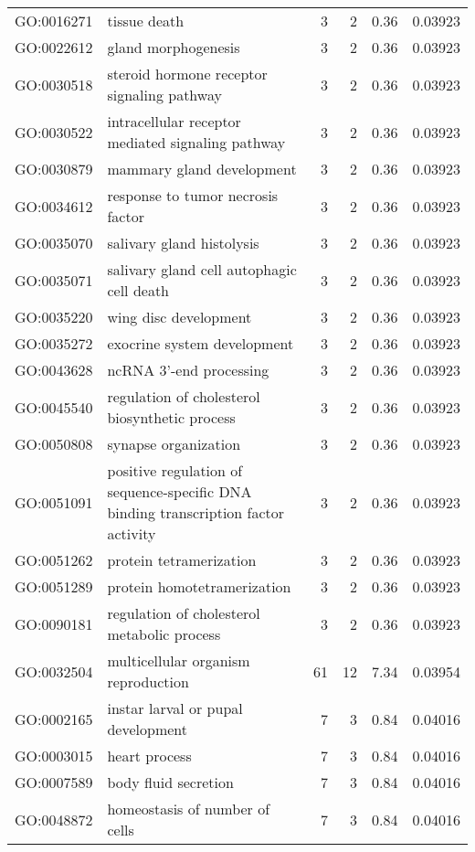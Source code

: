 \begin{longtable}{lp{4.5cm}rrrl}
  GO:0016271 & tissue death &   3 &   2 & 0.36 & 0.03923 \\ 
  GO:0022612 & gland morphogenesis &   3 &   2 & 0.36 & 0.03923 \\ 
  GO:0030518 & steroid hormone receptor signaling pathway &   3 &   2 & 0.36 & 0.03923 \\ 
  GO:0030522 & intracellular receptor mediated signaling pathway &   3 &   2 & 0.36 & 0.03923 \\ 
  GO:0030879 & mammary gland development &   3 &   2 & 0.36 & 0.03923 \\ 
  GO:0034612 & response to tumor necrosis factor &   3 &   2 & 0.36 & 0.03923 \\ 
  GO:0035070 & salivary gland histolysis &   3 &   2 & 0.36 & 0.03923 \\ 
  GO:0035071 & salivary gland cell autophagic cell death &   3 &   2 & 0.36 & 0.03923 \\ 
  GO:0035220 & wing disc development &   3 &   2 & 0.36 & 0.03923 \\ 
  GO:0035272 & exocrine system development &   3 &   2 & 0.36 & 0.03923 \\ 
  GO:0043628 & ncRNA 3'-end processing &   3 &   2 & 0.36 & 0.03923 \\ 
  GO:0045540 & regulation of cholesterol biosynthetic process &   3 &   2 & 0.36 & 0.03923 \\ 
  GO:0050808 & synapse organization &   3 &   2 & 0.36 & 0.03923 \\ 
  GO:0051091 & positive regulation of sequence-specific DNA binding transcription factor activity &   3 &   2 & 0.36 & 0.03923 \\ 
  GO:0051262 & protein tetramerization &   3 &   2 & 0.36 & 0.03923 \\ 
  GO:0051289 & protein homotetramerization &   3 &   2 & 0.36 & 0.03923 \\ 
  GO:0090181 & regulation of cholesterol metabolic process &   3 &   2 & 0.36 & 0.03923 \\ 
  GO:0032504 & multicellular organism reproduction &  61 &  12 & 7.34 & 0.03954 \\ 
  GO:0002165 & instar larval or pupal development &   7 &   3 & 0.84 & 0.04016 \\ 
  GO:0003015 & heart process &   7 &   3 & 0.84 & 0.04016 \\ 
  GO:0007589 & body fluid secretion &   7 &   3 & 0.84 & 0.04016 \\ 
  GO:0048872 & homeostasis of number of cells &   7 &   3 & 0.84 & 0.04016 \\ 

\end{longtable}
